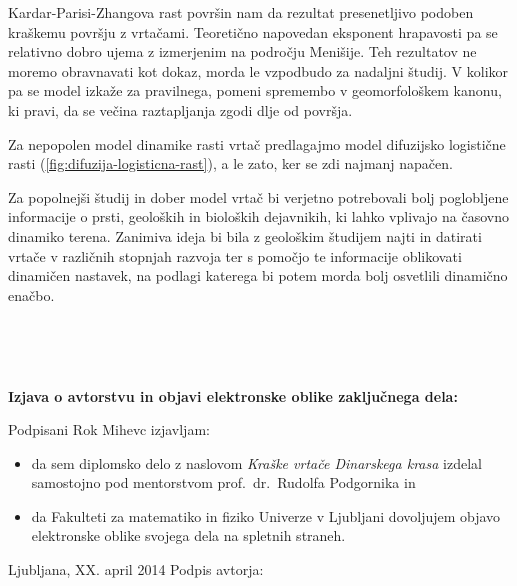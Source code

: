 \documentclass[a4paper, twoside, 12pt]{book}
\begin{document}
Kardar-Parisi-Zhangova rast površin nam da rezultat presenetljivo podoben kraškemu površju z vrtačami. Teoretično napovedan eksponent hrapavosti pa se relativno dobro ujema z izmerjenim na področju Menišije. Teh rezultatov ne moremo obravnavati kot dokaz, morda le vzpodbudo za nadaljni študij. V kolikor pa se model izkaže za pravilnega, pomeni spremembo v geomorfološkem kanonu, ki pravi, da se večina raztapljanja zgodi dlje od površja.

Za nepopolen model dinamike rasti vrtač predlagajmo model difuzijsko logistične rasti (\ref{fig:difuzija-logisticna-rast}), a le zato, ker se zdi najmanj napačen.

Za popolnejši študij in dober model vrtač bi verjetno potrebovali bolj poglobljene informacije o prsti, geoloških in bioloških dejavnikih, ki lahko vplivajo na časovno dinamiko terena. Zanimiva ideja bi bila z geološkim študijem najti in datirati vrtače v različnih stopnjah razvoja ter s pomočjo te informacije oblikovati dinamičen nastavek, na podlagi katerega bi potem morda bolj osvetlili dinamično enačbo.

\newpage
\ \thispagestyle{empty}


            \nocite{*}
            \newpage
            {}
            

\newpage
\ \thispagestyle{empty}



\vspace*{1cm}
\begin{center} {\Large \textbf{\sc Izjava o avtorstvu in objavi elektronske oblike zaključnega dela: }} \end{center}

  \vspace{1cm} \noindent Podpisani Rok Mihevc izjavljam:
  \noindent 

  \begin{itemize}
    \item 
      da sem diplomsko delo z naslovom \emph{Kraške vrtače Dinarskega krasa} izdelal samostojno pod mentorstvom prof.\ dr.\ \mbox{Rudolfa} \mbox{Podgornika} in
    \item
da Fakulteti za matematiko in fiziko Univerze v Ljubljani dovoljujem objavo elektronske 
oblike svojega dela na spletnih straneh.
  \end{itemize}

      \vspace{1cm} \noindent Ljubljana, XX. april 2014 \hfill Podpis avtorja:
\end{document}

